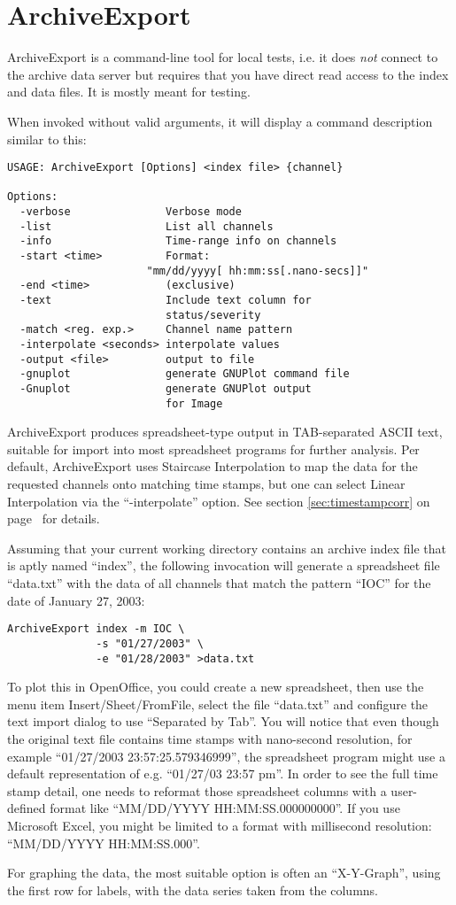 \section{ArchiveExport}
ArchiveExport is a command-line tool for local tests, i.e. it does
\emph{not} connect to the archive data server but requires that
you have direct read access to the index and data files.
It is mostly meant for testing.

When invoked without valid arguments, it will display a command
description similar to this:

\begin{lstlisting}[frame=none,keywordstyle=\sffamily]
USAGE: ArchiveExport [Options] <index file> {channel}
 
Options:
  -verbose               Verbose mode
  -list                  List all channels
  -info                  Time-range info on channels
  -start <time>          Format:
                      "mm/dd/yyyy[ hh:mm:ss[.nano-secs]]"
  -end <time>            (exclusive)
  -text                  Include text column for
                         status/severity
  -match <reg. exp.>     Channel name pattern
  -interpolate <seconds> interpolate values
  -output <file>         output to file
  -gnuplot               generate GNUPlot command file
  -Gnuplot               generate GNUPlot output
                         for Image
\end{lstlisting}

\noindent ArchiveExport produces spreadsheet-type output in
TAB-separated ASCII text, suitable for import into most spreadsheet
programs for further analysis. Per default, ArchiveExport uses
Staircase Interpolation to map the data for the requested channels
onto matching time stamps, but one can select Linear Interpolation via
the ``-interpolate'' option. See section \ref{sec:timestampcorr} on
page~\pageref{sec:timestampcorr} for details.

Assuming that your current working directory contains an
archive index file that is aptly named ``index'', the following
invocation will generate a spreadsheet file ``data.txt'' with the data
of all channels that match the pattern ``IOC'' for the date of January
27, 2003:

\begin{lstlisting}[frame=none,keywordstyle=\sffamily]
ArchiveExport index -m IOC \
              -s "01/27/2003" \
              -e "01/28/2003" >data.txt
\end{lstlisting}

\noindent To plot this in OpenOffice, you could create a new
spreadsheet, then use the menu item Insert/Sheet/FromFile, select the
file ``data.txt'' and configure the text import dialog to use
``Separated by Tab''. You will notice that even though the original
text file contains time stamps with nano-second resolution, for
example ``01/27/2003 23:57:25.579346999'', the spreadsheet program
might use a default representation of e.g. 
``01/27/03 23:57 pm''.
In order to see the full time stamp detail, one needs to reformat
those spreadsheet columns with a user-defined format like
``MM/DD/YYYY HH:MM:SS.000000000''.
If you use Microsoft Excel, you might be limited to a format with
millisecond resolution: ``MM/DD/YYYY HH:MM:SS.000''.

For graphing the data, the most suitable option is often an
``X-Y-Graph'', using the first row for labels, with the data series
taken from the columns.
